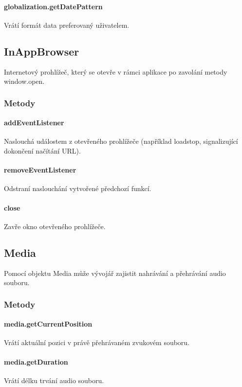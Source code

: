 \paragraph{globalization.getDatePattern}
Vrátí formát data preferovaný uživatelem.

\subsection{InAppBrowser}
Internetový prohlížeč, který se otevře v rámci aplikace po zavolání metody window.open.

\subsubsection{Metody}
\paragraph{addEventListener}
Naslouchá událostem z otevřeného prohlížeče (například loadstop, signalizující dokončení načítání URL).

\paragraph{removeEventListener}
Odstraní naslouchání vytvořené předchozí funkcí.

\paragraph{close}
Zavře okno otevřeného prohlížeče.

\subsection{Media}
Pomocí objektu Media může vývojář zajistit nahrávání a přehrávání audio souboru.

\subsubsection{Metody}
\paragraph{media.getCurrentPosition}
Vrátí aktuální pozici v právě přehrávaném zvukovém souboru.

\paragraph{media.getDuration}
Vrátí délku trvání audio souboru.

